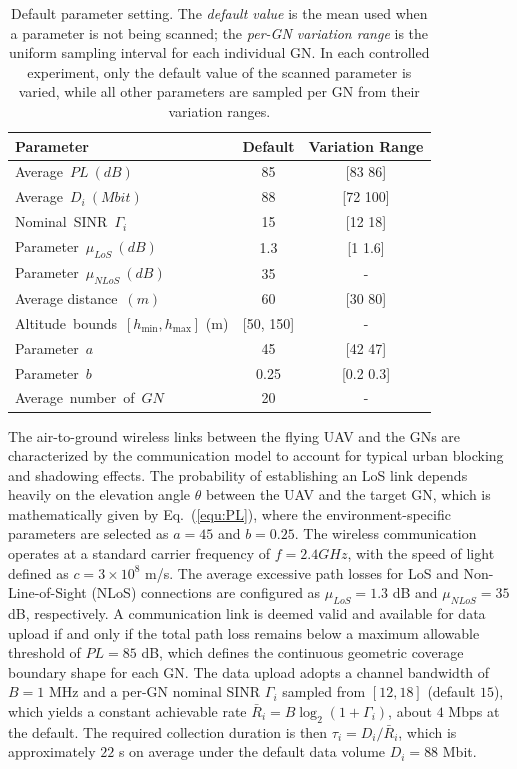 \begin{table}%
\caption{Default parameter setting.
The \emph{default value} is the mean used when a parameter is not being scanned; the \emph{per-GN variation range} is the uniform sampling interval for each individual GN.
In each controlled experiment, only the default value of the scanned parameter is varied, while all other parameters are sampled per GN from their variation ranges.}\label{tbl:parameters}
\begin{tabular*}{\tblwidth}{lcc}
\toprule
 Parameter & Default & Variation Range \\ %
\midrule
 Average\ $PL\ (dB)$ & 85  & [83 86]\\
 Average\ $D_i\ (Mbit)$ & 88 & [72 100]\\
 Nominal\ SINR\ $\Gamma_i$ & 15 & [12 18]\\
 Parameter\ $\mu _{LoS}\ (dB)$& 1.3 & [1 1.6]\\
 Parameter\ $\mu _{NLoS}\ (dB)$& 35 & -\\
 Average distance\ $(m)$& 60 & [30 80]\\
 Altitude\ bounds\ $[h_{\min},h_{\max}]$ (m) & [50, 150] & -\\
 Parameter\ $a$& 45 & [42 47]\\
 Parameter\ $b$& 0.25 & [0.2 0.3]\\
 Average\ number\ of\ $GN$& 20 & -\\
\bottomrule
\end{tabular*}
\end{table}


The air-to-ground wireless links between the flying UAV and the GNs are characterized by the communication model to account for typical urban blocking and shadowing effects.
The probability of establishing an LoS link depends heavily on the elevation angle $\theta$ between the UAV and the target GN, which is mathematically given by Eq.~(\ref{equ:PL}), where the environment-specific parameters are selected as $a = 45$ and $b = 0.25$.
The wireless communication operates at a standard carrier frequency of $f = 2.4 GHz$, with the speed of light defined as $c = 3 \times 10^8$ m/s.
The average excessive path losses for LoS and Non-Line-of-Sight (NLoS) connections are configured as $\mu_{LoS} = 1.3$ dB and $\mu_{NLoS} = 35$ dB, respectively.
A communication link is deemed valid and available for data upload if and only if the total path loss remains below a maximum allowable threshold of $PL = 85$ dB, which defines the continuous geometric coverage boundary shape for each GN.
The data upload adopts a channel bandwidth of $B = 1$ MHz and a per-GN nominal SINR $\Gamma_i$ sampled from $[12, 18]$ (default $15$), which yields a constant achievable rate $\bar{R}_i = B\log_2(1+\Gamma_i)$, about $4$ Mbps at the default. The required collection duration is then $\tau_i = D_i/\bar{R}_i$, which is approximately $22$ s on average under the default data volume $D_i = 88$ Mbit.


